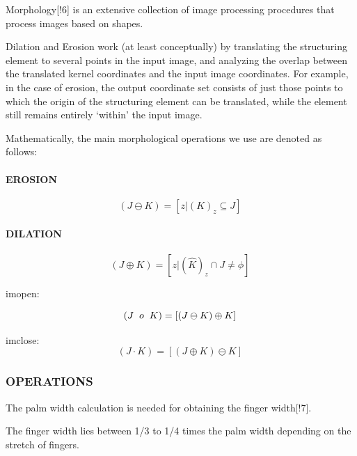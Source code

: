 \documentclass[conference]{IEEEtran}
\begin{document}
Morphology[!6] is an extensive collection of image processing procedures that process images based on shapes.

 Dilation and Erosion work (at least conceptually) by translating the structuring element to several points in the input image, and analyzing the overlap between the translated kernel coordinates and the input image coordinates. For example, in the case of erosion, the output coordinate set consists of just those points to which the origin of the structuring element can be translated, while the element still remains entirely `within' the input image.

Mathematically, the main morphological operations we use are denoted as follows:

\paragraph{EROSION}
\[
    \left(J \ominus K\right) = \left[z|(K)_z\subseteq J \right]\,
\]

\paragraph{DILATION}
\[
    \left(J \oplus K\right) =  \left[z|(\widehat{K})_z\cap J \neq \phi \right]\,
\]

imopen:

\[
    \left(J \hspace{2mm} o\hspace{2mm} K\right) =  \left[\left(J \ominus K \right) \oplus K \right]\,
\]

imclose:
\[
    \left(J  \cdot  K\right) =  \left[\left(J \oplus K \right) \ominus K \right]\,
\]


\subsubsection{OPERATIONS}
The palm width calculation is needed for obtaining the finger width[!7].

The finger width lies between 1/3 to 1/4 times the palm width depending on the stretch of fingers.
\end{document}
